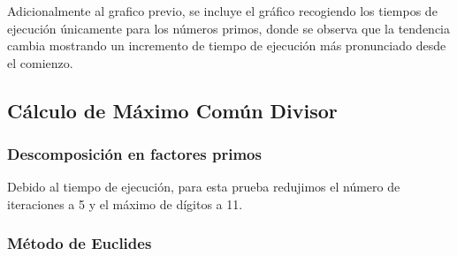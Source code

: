 \begin{figure}[H]
\end{figure}

Adicionalmente al grafico previo, se incluye el gráfico recogiendo los tiempos de ejecución únicamente para los números primos, donde se observa que la tendencia cambia mostrando un incremento de tiempo de ejecución más pronunciado desde el comienzo.
\begin{figure}[H]
\end{figure}

\subsection{Cálculo de Máximo Común Divisor}

\subsubsection{Descomposición en factores primos}
Debido al tiempo de ejecución, para esta prueba redujimos el número de iteraciones a 5 y el máximo de dígitos a 11.
\begin{figure}[H]
\end{figure}


\subsubsection{Método de Euclides}
\begin{figure}[H]
\end{figure}